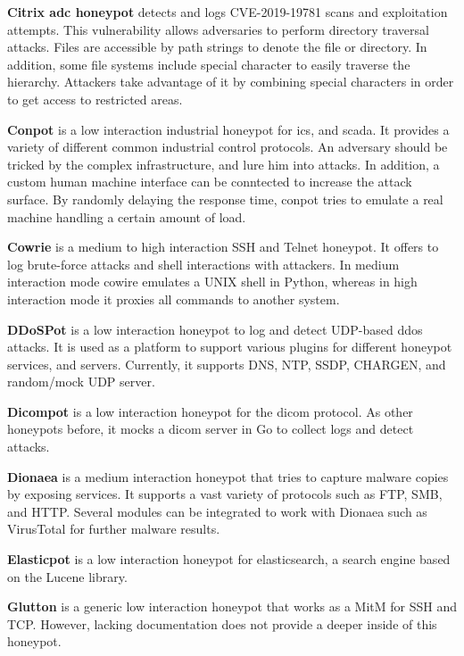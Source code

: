 \textbf{Citrix \ac{adc} honeypot} \cite{citrixhoneypot2020} detects and logs CVE-2019-19781\cite{CVE-2019-19781} scans and exploitation attempts.
This vulnerability allows adversaries to perform directory traversal attacks.
Files are accessible by path strings to denote the file or directory.
In addition, some file systems include special character to easily traverse the hierarchy.
Attackers take advantage of it by combining special characters in order to get access to restricted areas. \cite{flanders2019}

\textbf{Conpot} \cite{conpot2021} is a low interaction industrial honeypot for \ac{ics}, and \ac{scada}.
It provides a variety of different common industrial control protocols.
An adversary should be tricked by the complex infrastructure, and lure him into attacks.
In addition, a custom human machine interface can be conntected to increase the attack surface.
By randomly delaying the response time, conpot tries to emulate a real machine handling a certain amount of load.

\textbf{Cowrie} \cite{cowire2021} is a medium to high interaction SSH and Telnet honeypot.
It offers to log brute-force attacks and shell interactions with attackers.
In medium interaction mode cowire emulates a UNIX shell in Python, whereas in high interaction mode it proxies all commands to another system.

\textbf{DDoSPot} \cite{ddosspot2021} is a low interaction honeypot to log and detect UDP-based \ac{ddos} attacks.
It is used as a platform to support various plugins for different honeypot services, and servers.
Currently, it supports DNS, NTP, SSDP, CHARGEN, and random/mock UDP server.

\textbf{Dicompot} \cite{dicompot2021} is a low interaction honeypot for the \ac{dicom} protocol.
As other honeypots before, it mocks a \ac{dicom} server in Go to collect logs and detect attacks.

\textbf{Dionaea} \cite{dionaea2021} is a medium interaction honeypot that tries to capture malware copies by exposing services.
It supports a vast variety of protocols such as FTP, SMB, and HTTP.
Several modules can be integrated to work with Dionaea such as VirusTotal for further malware results.

\textbf{Elasticpot} \cite{elasticpot2021} is a low interaction honeypot for elasticsearch, a search engine based on the Lucene library.

\textbf{Glutton} \cite{glutton2021} is a generic low interaction honeypot that works as a MitM for SSH and TCP.
However, lacking documentation does not provide a deeper inside of this honeypot.

